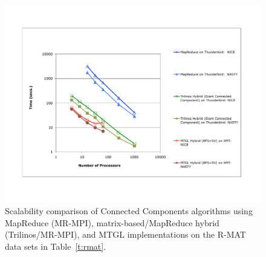 \begin{figure}[htb]
\includegraphics[width=\textwidth]{fig_cc_big.pdf}
\caption{Scalability comparison of Connected Components algorithms using 
MapReduce (MR-MPI),
matrix-based/MapReduce hybrid (Trilinos/MR-MPI), and MTGL implementations
on the R-MAT data sets in Table~\ref{t:rmat}.}
\label{f:ccbig}
\end{figure}
